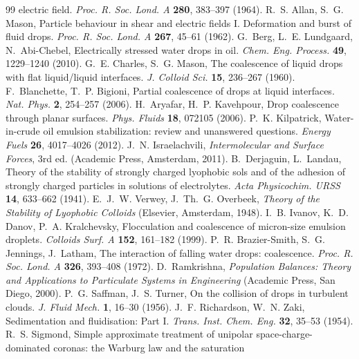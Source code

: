 \documentclass[aps,prfluids,reprint,amsmath,amssymb,superscriptaddress,longbibliography]{revtex4-2}
\begin{document}
\begin{thebibliography}{99}
electric field. \emph{Proc. R. Soc. Lond. A} \textbf{280}, 383--397 (1964).
 R.~S. Allan, S.~G. Mason, Particle behaviour in
shear and electric fields I. Deformation and burst of fluid drops.
\emph{Proc. R. Soc. Lond. A} \textbf{267}, 45--61 (1962).
 G.~Berg, L.~E. Lundgaard, N.~Abi-Chebel, Electrically
stressed water drops in oil. \emph{Chem. Eng. Process.} \textbf{49},
1229--1240 (2010).
 G.~E. Charles, S.~G. Mason, The coalescence of
liquid drops with flat liquid/liquid interfaces. \emph{J. Colloid Sci.}
\textbf{15}, 236--267 (1960).
 F.~Blanchette, T.~P. Bigioni, Partial coalescence
of drops at liquid interfaces. \emph{Nat. Phys.} \textbf{2}, 254--257
(2006).
 H.~Aryafar, H.~P. Kavehpour, Drop coalescence through
planar surfaces. \emph{Phys. Fluids} \textbf{18}, 072105 (2006).
 P.~K. Kilpatrick, Water-in-crude oil emulsion
stabilization: review and unanswered questions. \emph{Energy Fuels}
\textbf{26}, 4017--4026 (2012).
 J.~N. Israelachvili, \emph{Intermolecular and
Surface Forces}, 3rd ed. (Academic Press, Amsterdam, 2011).
 B.~Derjaguin, L.~Landau, Theory of the
stability of strongly charged lyophobic sols and of the adhesion of
strongly charged particles in solutions of electrolytes. \emph{Acta
Physicochim. URSS} \textbf{14}, 633--662 (1941).
 E.~J.~W. Verwey, J.~Th.~G. Overbeek,
\emph{Theory of the Stability of Lyophobic Colloids} (Elsevier, Amsterdam,
1948).
 I.~B. Ivanov, K.~D. Danov, P.~A. Kralchevsky,
Flocculation and coalescence of micron-size emulsion droplets.
\emph{Colloids Surf. A} \textbf{152}, 161--182 (1999).
 P.~R. Brazier-Smith, S.~G. Jennings, J.~Latham,
The interaction of falling water drops: coalescence. \emph{Proc. R. Soc.
Lond. A} \textbf{326}, 393--408 (1972).
 D.~Ramkrishna, \emph{Population Balances: Theory
and Applications to Particulate Systems in Engineering} (Academic Press,
San Diego, 2000).
 P.~G. Saffman, J.~S. Turner, On the collision
of drops in turbulent clouds. \emph{J. Fluid Mech.} \textbf{1}, 16--30
(1956).
 J.~F. Richardson, W.~N. Zaki, Sedimentation
and fluidisation: Part I. \emph{Trans. Inst. Chem. Eng.} \textbf{32},
35--53 (1954).
 R.~S. Sigmond, Simple approximate treatment of
unipolar space-charge-dominated coronas: the Warburg law and the saturation

\end{thebibliography}
\end{document}
